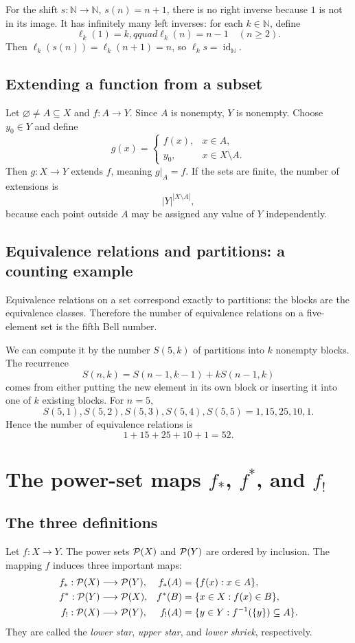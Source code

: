 \documentclass[11pt,openany]{book}
\newcommand{\N}{\mathbb N}\newcommand{\Z}{\mathbb Z}
\newcommand{\id}{\operatorname{id}}\newcommand{\Sym}{\operatorname{Sym}}
\theoremstyle{definition}
\begin{document}
For the shift $s:\N\to\N$, $s(n)=n+1$, there is no right inverse because $1$ is not in its image. It has infinitely many left inverses: for each $k\in\N$, define
\[
\ell_k(1)=k,qquad \ell_k(n)=n-1\quad(n\ge2).
\]
Then $\ell_k(s(n))=\ell_k(n+1)=n$, so $\ell_ks=\id_{\N}$.

\section{Extending a function from a subset}
Let $\varnothing\ne A\subseteq X$ and $f:A\to Y$. Since $A$ is nonempty, $Y$ is nonempty. Choose $y_0\in Y$ and define
\[
g(x)=\begin{cases}f(x),&x\in A,\\y_0,&x\in X\setminus A.\end{cases}
\]
Then $g:X\to Y$ extends $f$, meaning $g|_A=f$. If the sets are finite, the number of extensions is
\[
|Y|^{|X\setminus A|},
\]
because each point outside $A$ may be assigned any value of $Y$ independently.

\section{Equivalence relations and partitions: a counting example}
Equivalence relations on a set correspond exactly to partitions: the blocks are the equivalence classes. Therefore the number of equivalence relations on a five-element set is the fifth Bell number.

We can compute it by the number $S(5,k)$ of partitions into $k$ nonempty blocks. The recurrence
\[
S(n,k)=S(n-1,k-1)+kS(n-1,k)
\]
comes from either putting the new element in its own block or inserting it into one of $k$ existing blocks. For $n=5$,
\[
S(5,1),S(5,2),S(5,3),S(5,4),S(5,5)=1,15,25,10,1.
\]
Hence the number of equivalence relations is
\[
1+15+25+10+1=52.
\]


\chapter{The power-set maps $f_*$, $f^*$, and $f_!$}

\section{The three definitions}
Let $f:X\to Y$. The power sets $\mathcal P(X)$ and $\mathcal P(Y)$ are ordered by inclusion. The mapping $f$ induces three important maps:
\begin{align*}
f_*:\mathcal P(X)&\longrightarrow\mathcal P(Y),
&f_*(A)&=\{f(x):x\in A\},\\
f^*:\mathcal P(Y)&\longrightarrow\mathcal P(X),
&f^*(B)&=\{x\in X:f(x)\in B\},\\
f_!:\mathcal P(X)&\longrightarrow\mathcal P(Y),
&f_!(A)&=\{y\in Y:f^{-1}(\{y\})\subseteq A\}.
\end{align*}
They are called the \emph{lower star}, \emph{upper star}, and \emph{lower shriek}, respectively.
\end{document}
